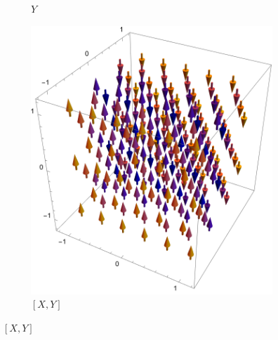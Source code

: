 \documentclass[spanish]{book}
\theoremstyle{definition}
\begin{document}
\begin{figure}[H]
\begin{subfigure}{0.5\linewidth}
			\caption*{$Y$}
		\end{subfigure}
		\begin{center}
			\begin{subfigure}{0.5\linewidth}
				\centering
				\includegraphics[width=0.9\linewidth]{fig12}
				\caption*{$[X,Y]$}
			\end{subfigure}
		\end{center}
	\end{figure}
	
\end{document}
